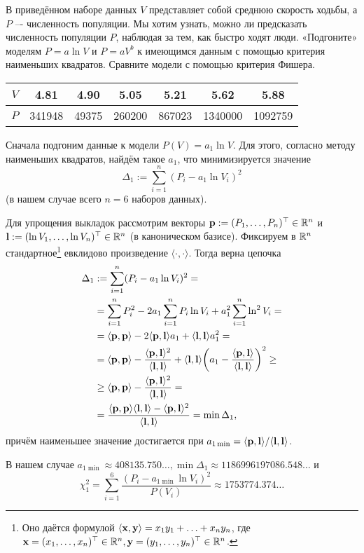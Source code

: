  В приведённом наборе данных $V$ представляет собой среднюю скорость ходьбы, а $P$ –- численность популяции. Мы хотим узнать, можно ли предсказать численность популяции $P$, наблюдая за тем, как быстро ходят люди. «Подгоните» моделям $P=a \ln V$ и $P=aV^b$ к имеющимся данным с помощью критерия наименьших квадратов. Сравните модели с помощью критерия Фишера.\par

\begin{center}
\begin{tabular}{ |c|c|c|c|c|c|c| }
\hline
$V$ & 4.81 & 4.90 & 5.05 & 5.21 & 5.62 & 5.88\\
\hline
$P$ & 341948 & 49375 & 260200 & 867023 & 1340000 & 1092759\\
\hline
\end{tabular}
\end{center}

Сначала подгоним данные к модели $P(V)=a_1\ln V$. Для этого, согласно методу наименьших квадратов, найдём такое $a_1$, что минимизируется значение
\[ \Delta _1 := \sum \limits_{i=1}^n (P_i - a_1 \ln V_i)^2 \]
(в нашем случае всего $n=6$ наборов данных).\par
Для упрощения выкладок рассмотрим векторы $\mathbf{p} := (P_1, \ldots, P_n)^\top \in \mathbb{R}^n$ и $\mathbf{l} := (\ln V_1, \ldots, \ln V_n)^\top \in \mathbb{R}^n$ (в каноническом базисе). Фиксируем в $\mathbb{R}^n$ стандартное\footnote{Оно даётся формулой $\langle \mathbf{x}, \mathbf{y} \rangle = x_1 y_1 + \ldots + x_n y_n$, где $\mathbf{x} = (x_1, \ldots, x_n)^\top \in \mathbb{R}^n, \mathbf{y} = (y_1, \ldots, y_n)^\top \in \mathbb{R}^n$.} евклидово произведение $\langle \cdot, \cdot \rangle$. Тогда верна цепочка
\begin{align*}
\Delta _1 & := \sum \limits_{i=1}^n (P_i - a_1 \ln V_i)^2 =\\
& = \sum \limits_{i=1}^n P_i^2 - 2a_1 \sum \limits_{i=1}^n P_i \ln V_i + a_1^2 \sum \limits_{i=1}^n \ln ^2 V_i =\\
& = \langle \mathbf{p}, \mathbf{p} \rangle - 2 \langle \mathbf{p}, \mathbf{l} \rangle a_1 + \langle \mathbf{l}, \mathbf{l} \rangle a_1^2 = \\
& = \langle \mathbf{p}, \mathbf{p} \rangle - \dfrac{\langle \mathbf{p}, \mathbf{l} \rangle^2}{\langle \mathbf{l}, \mathbf{l} \rangle} +
\langle \mathbf{l}, \mathbf{l} \rangle \bigg(  a_1 - \dfrac{\langle \mathbf{p}, \mathbf{l} \rangle}{\langle \mathbf{l}, \mathbf{l} \rangle} \bigg) ^2 \ge \\
& \ge \langle \mathbf{p}, \mathbf{p} \rangle - \dfrac{\langle \mathbf{p}, \mathbf{l} \rangle^2}{\langle \mathbf{l}, \mathbf{l} \rangle} =\\
& = \dfrac{\langle \mathbf{p}, \mathbf{p} \rangle\langle \mathbf{l}, \mathbf{l} \rangle - \langle \mathbf{p}, \mathbf{l} \rangle^2}{\langle \mathbf{l}, \mathbf{l} \rangle} = \min \Delta _1,
\end{align*}
причём наименьшее значение достигается при $a_{1\min}=\langle \mathbf{p}, \mathbf{l} \rangle / \langle \mathbf{l}, \mathbf{l} \rangle$.\par
В нашем случае $a_{1\min} \approx 408135.750\ldots, \min \Delta _1 \approx 1186996197086.548\ldots$ и 
\[ \chi _1^2 = \sum \limits _{i=1}^6 \dfrac{(P_i - a_{1 \min} \ln V_i)^2}{P(V_i)} \approx 1753774.374\ldots \]

